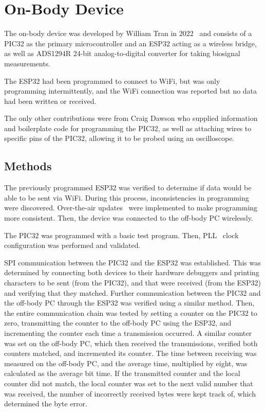 \chapter{On-Body Device}
The on-body device was developed by William Tran in 2022~\cite{Tran:2022} and consists of
a PIC32 as the primary microcontroller and an ESP32 acting as a wireless bridge,
as well as ADS1294R 24-bit analog-to-digital converter for taking biosignal measurements.

The ESP32 had been programmed to connect to WiFi, but was only programming intermittently,
and the WiFi connection was reported but no data had been written or received.

The only other contributions were from Craig Dawson who supplied information and boilerplate code for programming the PIC32,
as well as attaching wires to specific pins of the PIC32, allowing it to be probed using an oscilloscope.


\section{Methods}
The previously programmed ESP32 was verified to determine if data would be able to be sent via WiFi.
During this process, inconsistencies in programming were discovered.
Over-the-air updates~\cite{Quadri:2014} were implemented to make programming more consistent.
Then, the device was connected to the off-body PC wirelessly.

The PIC32 was programmed with a basic test program.
Then, PLL~\cite{Maji:2016} clock configuration was performed and validated.

SPI communication between the PIC32 and the ESP32 was established.
This was determined by connecting both devices to their hardware debuggers and printing characters to be sent (from the PIC32),
and that were received (from the ESP32) and verifying that they matched.
Further communication between the PIC32 and the off-body PC through the ESP32 was verified using a similar method.
Then, the entire communication chain was tested by setting a counter on the PIC32 to zero,
transmitting the counter to the off-body PC using the ESP32, and incrementing the counter each time a transmission occurred.
A similar counter was set on the off-body PC, which then received the transmissions, verified both counters matched, and incremented its counter.
The time between receiving was measured on the off-body PC, and the average time, multiplied by eight, was calculated as the average bit time.
If the transmitted counter and the local counter did not match, the local counter was set to the next valid number that was received,
the number of incorrectly received bytes were kept track of, which determined the byte error.

